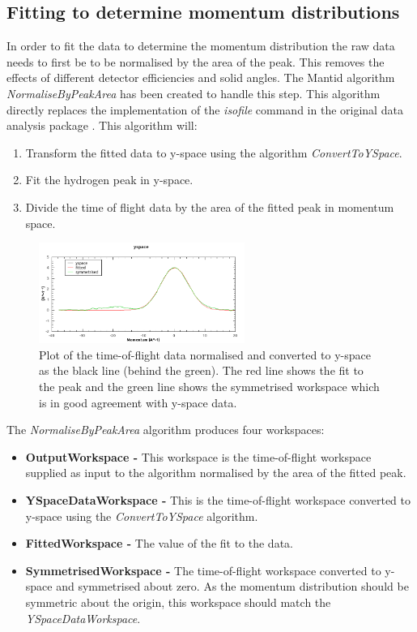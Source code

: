 \documentclass[paper=a4, fontsize=11pt]{scrartcl}	%
\numberwithin{equation}{section}															%
\numberwithin{figure}{section}																%
\numberwithin{table}{section}
\begin{document}
\subsection{Fitting to determine momentum distributions}
\label{subsec:fitting-momentum-distributions}
In order to fit the data to determine the momentum distribution the raw data needs to first be to be normalised by the area of the peak. This removes the effects of different detector efficiencies and solid angles. The Mantid algorithm \textit{NormaliseByPeakArea} has been created to handle this step. This algorithm directly replaces the implementation of the \textit{isofile} command in the original data analysis package \cite{mayers2010user}. This algorithm will:

\begin{enumerate}
\item Transform the fitted data to y-space using the algorithm \textit{ConvertToYSpace}.
\item Fit the hydrogen peak in y-space.
\item Divide the time of flight data by the area of the fitted peak in momentum space.
\end{enumerate}

\begin{figure}[H]
\centering
\includegraphics[width=0.6\textwidth]{img/yspace-norm.png}
\caption{Plot of the time-of-flight data normalised and converted to y-space as the black line (behind the green). The red line shows the fit to the peak and the green line shows the symmetrised workspace which is in good agreement with y-space data.}
\label{fig:yspace-norm}
\end{figure}

The \textit{NormaliseByPeakArea} algorithm produces four workspaces:

\begin{itemize}
\item \textbf{OutputWorkspace - } This workspace is the time-of-flight workspace supplied as input to the algorithm normalised by the area of the fitted peak.
\item \textbf{YSpaceDataWorkspace - } This is the time-of-flight workspace converted to y-space using the \textit{ConvertToYSpace} algorithm.
\item \textbf{FittedWorkspace - } The value of the fit to the data.
\item \textbf{SymmetrisedWorkspace - } The time-of-flight workspace converted to y-space and symmetrised about zero. As the momentum distribution should be symmetric about the origin, this workspace should match the \textit{YSpaceDataWorkspace}.
\end{itemize}
\end{document}
